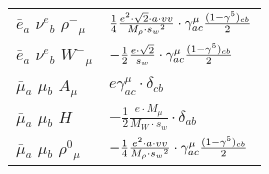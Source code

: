 \begin{center}
\begin{tabular}{|l|l|}
$\bar{e}{}_{a }$ \phantom{-} $\nu^e{}_{b }$ \phantom{-} $\rho^-{}_{\mu }$ \phantom{-}  &
	$\frac{1}{4}\frac{ e{}^2  \cdot\sqrt{2} \cdot a \cdot vv}{ M_{\rho} \cdot s_w{}^2 }\cdot \gamma_{a c}^\mu {(1-\gamma^5)_{c b}\over 2} $\\[2mm]
$\bar{e}{}_{a }$ \phantom{-} $\nu^e{}_{b }$ \phantom{-} $W^-{}_{\mu }$ \phantom{-}  &
	$-\frac{1}{2}\frac{ e \cdot\sqrt{2}}{ s_w}\cdot \gamma_{a c}^\mu {(1-\gamma^5)_{c b}\over 2} $\\[2mm]
$\bar{\mu}{}_{a }$ \phantom{-} $\mu{}_{b }$ \phantom{-} ${A}_{\mu }$ \phantom{-}  &
	$ e\gamma_{a c}^\mu \cdot \delta_{c b} $\\[2mm]
$\bar{\mu}{}_{a }$ \phantom{-} $\mu{}_{b }$ \phantom{-} ${H}_{}$ \phantom{-}  &
	$-\frac{1}{2}\frac{ e \cdot M_\mu}{ M_W \cdot s_w}\cdot \delta_{a b} $\\[2mm]
$\bar{\mu}{}_{a }$ \phantom{-} $\mu{}_{b }$ \phantom{-} $\rho^0{}_{\mu }$ \phantom{-}  &
	$-\frac{1}{4}\frac{ e{}^2  \cdot a \cdot vv}{ M_{\rho} \cdot s_w{}^2 }\cdot \gamma_{a c}^\mu {(1-\gamma^5)_{c b}\over 2} $\\ \hline
\end{tabular}


\end{center}
